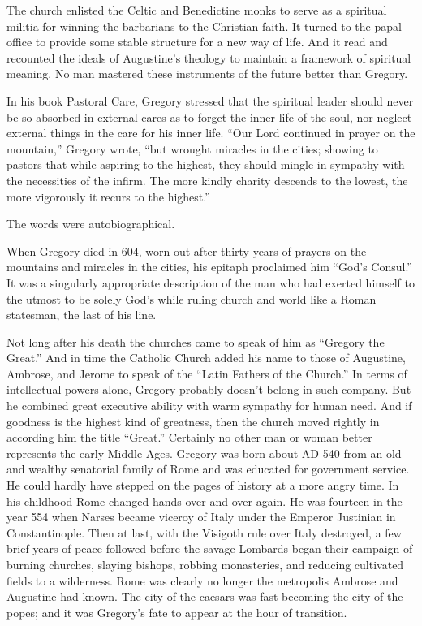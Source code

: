 The church enlisted the Celtic and Benedictine monks to serve as a spiritual militia for winning the
barbarians to the Christian faith. It turned to the papal office to provide some stable structure
for a new way of life. And it read and recounted the ideals of Augustine’s theology to maintain a
framework of spiritual meaning. No man mastered these instruments of the future better than Gregory.

In his book Pastoral Care, Gregory stressed that the spiritual leader should never be so absorbed in
external cares as to forget the inner life of the soul, nor neglect external things in the care for
his inner life. “Our Lord continued in prayer on the mountain,” Gregory wrote, “but wrought miracles
in the cities; showing to pastors that while aspiring to the highest, they should mingle in sympathy
with the necessities of the infirm. The more kindly charity descends to the lowest, the more
vigorously it recurs to the highest.”

The words were autobiographical.

When Gregory died in 604, worn out after thirty years of prayers on the mountains and miracles in
the cities, his epitaph proclaimed him “God’s Consul.” It was a singularly appropriate description
of the man who had exerted himself to the utmost to be solely God’s while ruling church and world
like a Roman statesman, the last of his line.

Not long after his death the churches came to speak of him as “Gregory the Great.” And in time the
Catholic Church added his name to those of Augustine, Ambrose, and Jerome to speak of the “Latin
Fathers of the Church.” In terms of intellectual powers alone, Gregory probably doesn’t belong in
such company. But he combined great executive ability with warm sympathy for human need. And if
goodness is the highest kind of greatness, then the church moved rightly in according him the title
“Great.” Certainly no other man or woman better represents the early Middle Ages. Gregory was born
about AD 540 from an old and wealthy senatorial family of Rome and was educated for government
service. He could hardly have stepped on the pages of history at a more angry time. In his childhood
Rome changed hands over and over again. He was fourteen in the year 554 when Narses became viceroy
of Italy under the Emperor Justinian in Constantinople. Then at last, with the Visigoth rule over
Italy destroyed, a few brief years of peace followed before the savage Lombards began their campaign
of burning churches, slaying bishops, robbing monasteries, and reducing cultivated fields to a
wilderness. Rome was clearly no longer the metropolis Ambrose and Augustine had known. The city of
the caesars was fast becoming the city of the popes; and it was Gregory’s fate to appear at the hour
of transition.

